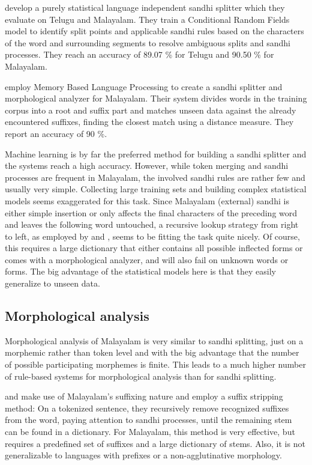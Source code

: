 \documentclass[a4paper]{article}
\begin{document}
\textcite{prathyusha2015sandhi} develop a purely statistical language independent sandhi splitter which they evaluate on Telugu and Malayalam. They train a Conditional Random Fields model to identify split points and applicable sandhi rules based on the characters of the word and surrounding segments to resolve ambiguous splits and sandhi processes. They reach an accuracy of 89.07 \% for Telugu and 90.50 \% for Malayalam.

\textcite{nisha2016sandhi} employ Memory Based Language Processing to create a sandhi splitter and morphological analyzer for Malayalam. Their system divides words in the training corpus into a root and suffix part and matches unseen data against the already encountered suffixes, finding the closest match using a distance measure. They report an accuracy of 90 \%.

Machine learning is by far the preferred method for building a sandhi splitter and the systems reach a high accuracy. However, while token merging and sandhi processes are frequent in Malayalam, the involved sandhi rules are rather few and usually very simple. Collecting large training sets and building complex statistical models seems exaggerated for this task. Since Malayalam (external) sandhi is either simple insertion or only affects the final characters of the preceding word and leaves the following word untouched, a recursive lookup strategy from right to left, as employed by \textcite{manju2009pos} and \textcite{bindu2011pos}, seems to be fitting the task quite nicely. Of course, this requires a large dictionary that either contains all possible inflected forms or comes with a morphological analyzer, and will also fail on unknown words or forms. The big advantage of the statistical models here is that they easily generalize to unseen data.

\subsection{Morphological analysis}

Morphological analysis of Malayalam is very similar to sandhi splitting, just on a morphemic rather than token level and with the big advantage that the number of possible participating morphemes is finite. This leads to a much higher number of rule-based systems for morphological analysis than for sandhi splitting.

\textcite{rajeev2007morph} and \textcite{jayan2011translation} make use of Malayalam's suffixing nature and employ a suffix stripping method: On a tokenized sentence, they recursively remove recognized suffixes from the word, paying attention to sandhi processes, until the remaining stem can be found in a dictionary. For Malayalam, this method is very effective, but requires a predefined set of suffixes and a large dictionary of stems. Also, it is not generalizable to languages with prefixes or a non-agglutinative morphology.
\end{document}
